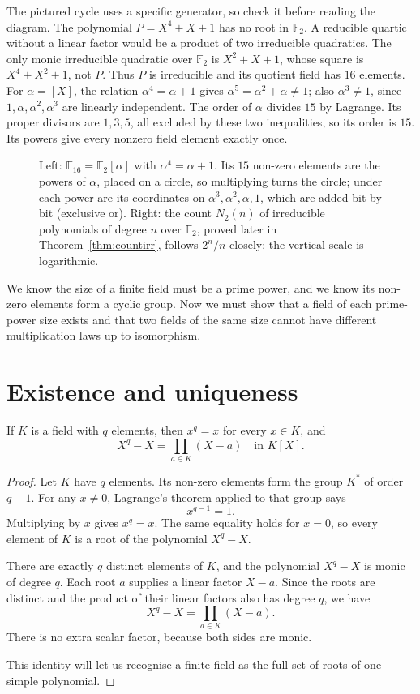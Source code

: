 The pictured cycle uses a specific generator, so check it before reading
the diagram. The polynomial $P=X^4+X+1$ has no root in $\mathbb F_2$.
A reducible quartic without a linear factor would be a product of two
irreducible quadratics. The only monic irreducible quadratic over
$\mathbb F_2$ is $X^2+X+1$, whose square is $X^4+X^2+1$, not $P$.
Thus $P$ is irreducible and its quotient field has $16$ elements.
For $\alpha=[X]$, the relation $\alpha^4=\alpha+1$ gives
$\alpha^5=\alpha^2+\alpha\ne1$; also $\alpha^3\ne1$, since
$1,\alpha,\alpha^2,\alpha^3$ are linearly independent.
The order of $\alpha$ divides $15$ by Lagrange. Its proper divisors
are $1,3,5$, all excluded by these two inequalities, so its order is
$15$. Its powers give every nonzero field element exactly once.

\begin{figure}[ht]
\centering
{}
\caption{Left: $\mathbb F_{16}=\mathbb F_2[\alpha]$ with $\alpha^4=\alpha+1$. Its $15$ non-zero elements are the powers of $\alpha$, placed on a circle, so multiplying turns the circle; under each power are its coordinates on $\alpha^3,\alpha^2,\alpha,1$, which are added bit by bit (exclusive or). Right: the count $N_2(n)$ of irreducible polynomials of degree $n$ over $\mathbb F_2$, proved later in Theorem~\ref{thm:countirr}, follows $2^n/n$ closely; the vertical scale is logarithmic.}
\label{fig:f16}
\end{figure}

We know the size of a finite field must be a prime power, and we know its non-zero elements form a cyclic group. Now we must show that a field of each prime-power size exists and that two fields of the same size cannot have different multiplication laws up to isomorphism.

\section{Existence and uniqueness}

\begin{lemma}\label{lem:xqx}
If $K$ is a field with $q$ elements, then $x^q=x$ for every $x\in K$, and
\[
X^q-X=\prod_{a\in K}(X-a)\quad\text{in }K[X].
\]
\end{lemma}
\begin{proof}
Let $K$ have $q$ elements.
Its non-zero elements form the group
$K^*$ of order $q-1$.
For any $x\ne0$, Lagrange's theorem
applied to that group says
\[
x^{q-1}=1.
\]
Multiplying by $x$ gives $x^q=x$.
The same equality holds for $x=0$,
so every element of $K$ is a root
of the polynomial $X^q-X$.

There are exactly $q$ distinct
elements of $K$, and the polynomial
$X^q-X$ is monic of degree $q$.
Each root $a$ supplies a linear
factor $X-a$. Since the roots are
distinct and the product of their
linear factors also has degree $q$,
we have
\[
\boxed{X^q-X=\prod_{a\in K}(X-a)}.
\]
There is no extra scalar factor,
because both sides are monic.

This identity will let us recognise
a finite field as the full set of
roots of one simple polynomial.
\end{proof}

